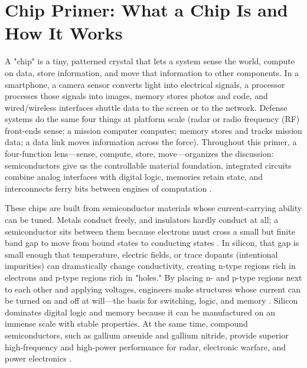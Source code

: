 \section{Chip Primer: What a Chip Is and How It Works}
\label{sec:chip-primer}

A "chip" is a tiny, patterned crystal that lets a system sense the world, compute on data, store information, and move that information to other components. In a smartphone, a camera sensor converts light into electrical signals, a processor processes those signals into images, memory stores photos and code, and wired/wireless interfaces shuttle data to the screen or to the network. Defense systems do the same four things at platform scale (radar or radio frequency (RF) front-ends sense; a mission computer computes; memory stores and tracks mission data; a data link moves information across the force). Throughout this primer, a four-function lens---sense, compute, store, move---organizes the discussion: semiconductors give us the controllable material foundation, integrated circuits combine analog interfaces with digital logic, memories retain state, and interconnects ferry bits between engines of computation \parencite{sze_physics_2007,smith_microelectronic_2015,rabaey_digital_2003,jacob_memory_2008}.

These chips are built from semiconductor materials whose current-carrying ability can be tuned. Metals conduct freely, and insulators hardly conduct at all; a semiconductor sits between them because electrons must cross a small but finite band gap to move from bound states to conducting states \parencite{ashcroft_solid_1976}. In silicon, that gap is small enough that temperature, electric fields, or trace dopants (intentional impurities) can dramatically change conductivity, creating n-type regions rich in electrons and p-type regions rich in "holes." By placing n- and p-type regions next to each other and applying voltages, engineers make structures whose current can be turned on and off at will---the basis for switching, logic, and memory \parencite{sze_physics_2007,pierret_semiconductor_1996, neamen_semiconductor_1997,sharma_solid_2013}. Silicon dominates digital logic and memory because it can be manufactured on an immense scale with stable properties. At the same time, compound semiconductors, such as gallium arsenide and gallium nitride, provide superior high-frequency and high-power performance for radar, electronic warfare, and power electronics \parencite{morkoc_handbook_2008,baliga_fundamentals_2019}.


